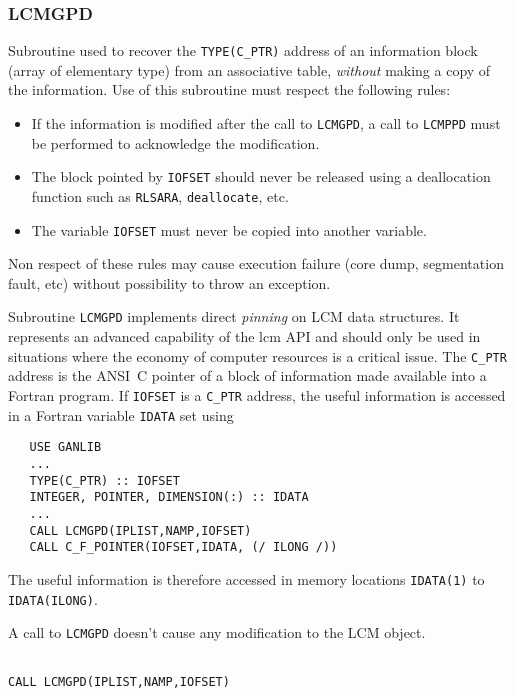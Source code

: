 \subsubsection{LCMGPD}

Subroutine used to recover the {\tt TYPE(C\_PTR)} address of an information block (array of elementary type) from an associative table,
{\sl without} making a copy of the information. Use of this subroutine must respect the following rules:
\begin{itemize}
\item If the information is modified after the call to {\tt LCMGPD}, a call to {\tt LCMPPD} 
must be performed to acknowledge the modification.
\item The block pointed by {\tt IOFSET} should never be released using a deallocation function such as
{\tt RLSARA}, {\tt deallocate}, etc.
\item The variable {\tt IOFSET} must never be copied into another variable.
\end{itemize}
Non respect of these rules may cause execution failure (core dump,
segmentation fault, etc) without possibility to throw an exception.

\vskip 0.2cm

Subroutine {\tt LCMGPD} implements direct {\sl pinning} on LCM data structures. It represents an advanced capability of the {\sc lcm} API and should only be used in situations where
the economy of computer resources is a critical issue. The {\tt C\_PTR} address is the ANSI~C pointer of a block of
information made available into a Fortran program. If {\tt IOFSET} is a {\tt C\_PTR} address, the useful information is
accessed in a Fortran variable {\tt IDATA} set using
\begin{verbatim}
   USE GANLIB
   ...
   TYPE(C_PTR) :: IOFSET
   INTEGER, POINTER, DIMENSION(:) :: IDATA
   ...
   CALL LCMGPD(IPLIST,NAMP,IOFSET)
   CALL C_F_POINTER(IOFSET,IDATA, (/ ILONG /))
\end{verbatim}

The useful information is therefore accessed in memory locations {\tt IDATA(1)} to {\tt IDATA(ILONG)}.

\vskip 0.2cm

A call to {\tt LCMGPD} doesn't cause any modification to the LCM object.

\vskip 0.5cm

\begin{verbatim}

CALL LCMGPD(IPLIST,NAMP,IOFSET)
\end{verbatim}

